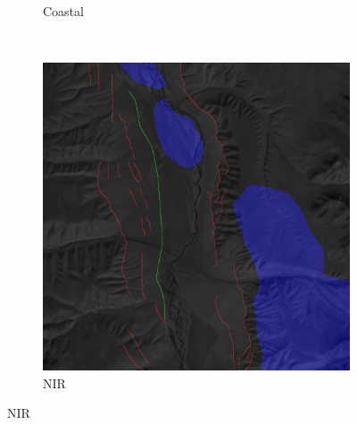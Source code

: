 \documentclass[11pt,a4paper]{article}
\begin{document}
\begin{figure}[t]
\begin{subfigure}[b]{0.18\textwidth}
        \caption{Coastal}
        \label{fig:features_ultrablue}
    \end{subfigure}
    ~
    \begin{subfigure}[b]{0.18\textwidth}
        \includegraphics[width=\textwidth]{graphics/data/0/features_nir.png}
        \caption{NIR}
        \label{fig:features_nir}
    \end{subfigure}


\end{figure}
\end{document}
